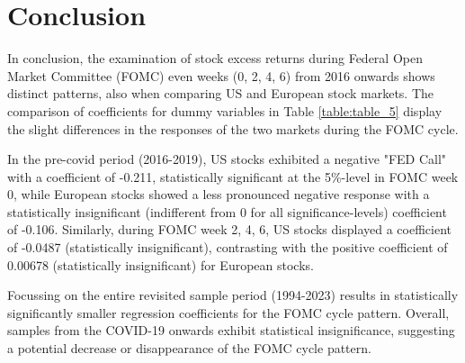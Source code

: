 



%

\chapter{Conclusion}
In conclusion, the examination of stock excess returns during Federal Open Market Committee (FOMC) even weeks (0, 2, 4, 6) from 2016 onwards shows distinct patterns, also when comparing US and European stock markets. The comparison of coefficients for dummy variables in Table \ref{table:table_5} display the slight differences in the responses of the two markets during the FOMC cycle.  

In the pre-covid period (2016-2019),  US stocks exhibited a negative "FED Call" with a coefficient of -0.211, statistically significant at the 5\%-level in FOMC week 0, while European stocks showed a less pronounced negative response with a statistically insignificant (indifferent from 0 for all significance-levels) coefficient of -0.106. Similarly, during FOMC week 2, 4, 6, US stocks displayed a coefficient of -0.0487 (statistically insignificant),  contrasting with the positive coefficient of 0.00678 (statistically insignificant) for European stocks. 

Focussing on the entire revisited sample period (1994-2023) results in statistically significantly smaller regression coefficients for the FOMC cycle pattern.  Overall, samples from the COVID-19 onwards exhibit statistical insignificance,  suggesting a potential decrease or disappearance of the FOMC cycle pattern.




